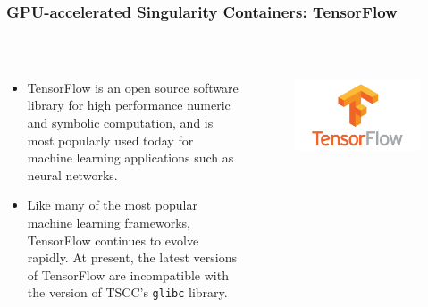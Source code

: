 \documentclass{beamer}
\begin{document}
\begin{frame}
   \frametitle{GPU-accelerated Singularity Containers: TensorFlow}
   \begin{columns}
      \begin{column}{0.6\textwidth}
         \begin{itemize}
            \setlength\itemsep{1.0em}
            \item TensorFlow is an open source software library for high 
               performance numeric and symbolic computation, and is most 
               popularly used today for machine learning applications 
               such as neural networks. 
            \item Like many of the most popular machine learning 
               frameworks, TensorFlow continues to evolve rapidly. At 
               present, the latest versions of TensorFlow are 
               incompatible with the version of TSCC's \texttt{glibc} 
               library.
         \end{itemize}
      \end{column}
      \hfill
      \begin{column}{0.5\textwidth}
         \begin{figure}[htbp]
            \includegraphics[width=1.0\textwidth]{images/tf_logo_social.png}
         \end{figure}
      \end{column}
   \end{columns}
\end{frame}
\end{document}
